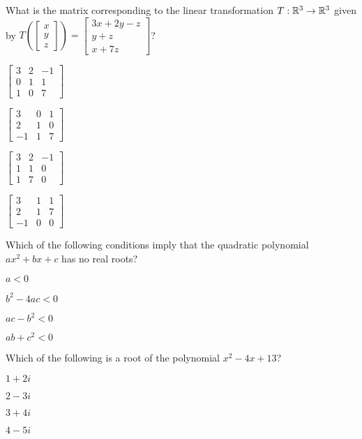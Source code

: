 \documentclass{article}
\begin{document}
\begin{readinessAssuranceTest}
\item What is the matrix corresponding to the linear transformation $T: \mathbb{R}^3 \rightarrow \mathbb{R}^3$ given by $T\left( \begin{bmatrix} x \\ y \\ z \end{bmatrix}\right) = \begin{bmatrix} 3x+2y-z \\ y+z \\x+7z \end{bmatrix}$?
\begin{multicols}{4}
\begin{readinessAssuranceTestChoices}
\item $\begin{bmatrix} 3 & 2 & -1 \\ 0 & 1 & 1 \\ 1 & 0 & 7  \end{bmatrix}$
\item $\begin{bmatrix} 3 & 0 & 1 \\ 2 & 1 & 0 \\ -1 & 1 & 7 \end{bmatrix}$
\item $\begin{bmatrix} 3 & 2 & -1 \\ 1 & 1 & 0 \\ 1 & 7 & 0 \end{bmatrix}$
\item $\begin{bmatrix}  3 & 1 & 1 \\ 2 & 1 & 7 \\ -1 & 0 & 0 \end{bmatrix}$
\end{readinessAssuranceTestChoices}
\end{multicols}

\item Which of the following conditions imply that the quadratic polynomial $ax^2+bx+c$ has no real roots?
\begin{readinessAssuranceTestChoices}
\item $a<0$
\item $b^2-4ac<0$
\item $ac-b^2<0$
\item $ab+c^2<0$
\end{readinessAssuranceTestChoices}

\item Which of the following is a root of the polynomial $x^2-4x+13$?
\begin{multicols}{4}
\begin{readinessAssuranceTestChoices}
\item $1+2i$
\item $2-3i$
\item $3+4i$
\item $4-5i$
\end{readinessAssuranceTestChoices}
\end{multicols}


\end{readinessAssuranceTest}
\end{document}
